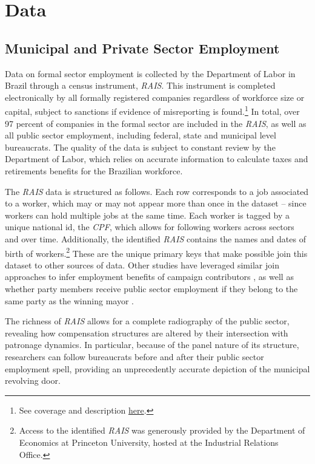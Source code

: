 \section{Data}
\label{sec:data}

\subsection{Municipal and Private Sector Employment}

Data on formal sector employment is collected by the Department of Labor in Brazil through a census instrument, \emph{RAIS}. This instrument is completed electronically by all formally registered companies regardless of workforce size or capital, subject to sanctions if evidence of misreporting is found.\footnote{See coverage and description \href{https://agenciabrasil.ebc.com.br/economia/noticia/2020-03/prazo-para-entrega-da-rais-comeca-hoje-e-vai-ate-17-de-abril}{here}.} In total, over 97 percent of companies in the formal sector are included in the \emph{RAIS}, as well as all public sector employment, including federal, state and municipal level bureaucrats. The quality of the data is subject to constant review by the Department of Labor, which relies on accurate information to calculate taxes and retirements benefits for the Brazilian workforce. 

The \emph{RAIS} data is structured as follows. Each row corresponds to a job associated to a worker, which may or may not appear more than once in the dataset -- since workers can hold multiple jobs at the same time. Each worker is tagged by a unique national id, the \emph{CPF}, which allows for following workers across sectors and over time. Additionally, the identified \emph{RAIS} contains the names and dates of birth of workers.\footnote{Access to the identified \emph{RAIS} was generously provided by the Department of Economics at Princeton University, hosted at the Industrial Relations Office.} These are the unique primary keys that make possible join this dataset to other sources of data. Other studies have leveraged similar join approaches to infer employment benefits of campaign contributors \citep{colonnelli2018patronage}, as well as whether party members receive public sector employment if they belong to the same party as the winning mayor \citep{brollo_victor_2017}.

The richness of \emph{RAIS} allows for a complete radiography of the public sector, revealing how compensation structures are altered by their intersection with patronage dynamics. In particular, because of the panel nature of its structure, researchers can follow bureaucrats before and after their public sector employment spell, providing an unprecedently accurate depiction of the municipal revolving door.

